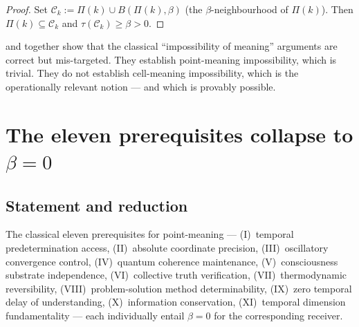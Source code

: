 \documentclass[11pt,twocolumn,a4paper]{article}
\newcommand{\Cell}{\mathcal{C}}
\begin{document}
\begin{proof}
Set $\Cell_k:=\Pi(k)\cup B(\Pi(k),\beta)$ (the $\beta$-neighbourhood
of $\Pi(k)$). Then $\Pi(k)\subseteq\Cell_k$ and
$\tau(\Cell_k)\ge\beta>0$.
\end{proof}

\begin{remark}\label{rem:cat-err}
 and  together show that the
classical ``impossibility of meaning'' arguments are correct but
mis-targeted. They establish point-meaning impossibility, which is
trivial. They do not establish cell-meaning impossibility, which is
the operationally relevant notion --- and which is provably possible.
\end{remark}

\section{The eleven prerequisites collapse to \texorpdfstring{$\beta=0$}{beta=0}}
\label{sec:eleven}

\subsection{Statement and reduction}

\begin{theorem}\label{thm:11-collapse}
The classical eleven prerequisites for point-meaning ---
(I)~temporal predetermination access,
(II)~absolute coordinate precision,
(III)~oscillatory convergence control,
(IV)~quantum coherence maintenance,
(V)~consciousness substrate independence,
(VI)~collective truth verification,
(VII)~thermodynamic reversibility,
(VIII)~problem-solution method determinability,
(IX)~zero temporal delay of understanding,
(X)~information conservation,
(XI)~temporal dimension fundamentality ---
each individually entail $\beta=0$ for the corresponding receiver.
\end{theorem}
\end{document}
